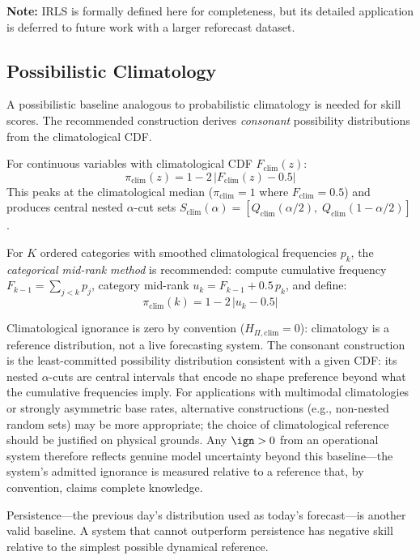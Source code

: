 \textbf{Note:} IRLS is formally defined here for completeness, but its
detailed application is deferred to future work with a larger
reforecast dataset.

\subsection{Possibilistic Climatology}\label{sec:poss_climatology}

A possibilistic baseline analogous to probabilistic climatology is
needed for skill scores. The recommended construction derives
\textit{consonant} possibility distributions from the climatological CDF.

For continuous variables with climatological CDF $F_{\mathrm{clim}}(z)$:
\begin{equation}
\pi_{\mathrm{clim}}(z) = 1 - 2\,\bigl|F_{\mathrm{clim}}(z) - 0.5\bigr|
\label{eq:poss_clim}
\end{equation}
This peaks at the climatological median ($\pi_{\mathrm{clim}} = 1$ where
$F_{\mathrm{clim}} = 0.5$) and produces central nested $\alpha$-cut sets
$S_{\mathrm{clim}}(\alpha) = [Q_{\mathrm{clim}}(\alpha/2),\;
Q_{\mathrm{clim}}(1 - \alpha/2)]$.

For $K$ ordered categories with smoothed climatological frequencies
$p_k$, the \textit{categorical mid-rank method} is recommended: compute
cumulative frequency $F_{k-1} = \sum_{j < k} p_j$, category mid-rank
$u_k = F_{k-1} + 0.5\, p_k$, and define:
\[
\pi_{\mathrm{clim}}(k) = 1 - 2\,|u_k - 0.5|
\]

Climatological ignorance is zero by convention
($H_{\Pi,\mathrm{clim}} = 0$): climatology is a reference distribution,
not a live forecasting system.
The consonant construction is the least-committed possibility distribution consistent with a given CDF: its nested $\alpha$-cuts are central intervals that encode no shape preference beyond what the cumulative frequencies imply. For applications with multimodal climatologies or strongly asymmetric base rates, alternative constructions (e.g., non-nested random sets) may be more appropriate; the choice of climatological reference should be justified on physical grounds. Any $\ign > 0$ from an operational system therefore reflects genuine model uncertainty beyond this baseline---the system's admitted ignorance is measured relative to a reference that, by convention, claims complete knowledge.

Persistence---the previous day's distribution used as today's
forecast---is another valid baseline. A system that cannot outperform
persistence has negative skill relative to the simplest possible
dynamical reference.
